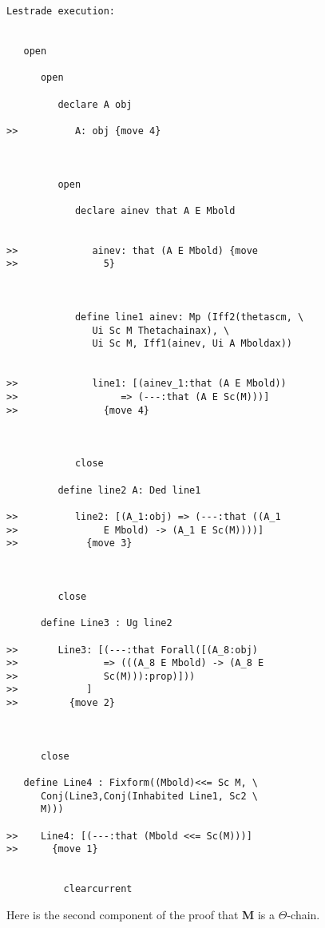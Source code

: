 \documentclass[12pt]{article}
\begin{document}
\begin{verbatim}Lestrade execution:


   open

      open

         declare A obj

>>          A: obj {move 4}



         open

            declare ainev that A E Mbold


>>             ainev: that (A E Mbold) {move
>>               5}



            define line1 ainev: Mp (Iff2(thetascm, \
               Ui Sc M Thetachainax), \
               Ui Sc M, Iff1(ainev, Ui A Mboldax))


>>             line1: [(ainev_1:that (A E Mbold))
>>                  => (---:that (A E Sc(M)))]
>>               {move 4}



            close

         define line2 A: Ded line1

>>          line2: [(A_1:obj) => (---:that ((A_1
>>               E Mbold) -> (A_1 E Sc(M))))]
>>            {move 3}



         close

      define Line3 : Ug line2

>>       Line3: [(---:that Forall([(A_8:obj)
>>               => (((A_8 E Mbold) -> (A_8 E
>>               Sc(M))):prop)]))
>>            ]
>>         {move 2}



      close

   define Line4 : Fixform((Mbold)<<= Sc M, \
      Conj(Line3,Conj(Inhabited Line1, Sc2 \
      M)))

>>    Line4: [(---:that (Mbold <<= Sc(M)))]
>>      {move 1}


          clearcurrent

\end{verbatim}

Here is the second component of the proof that {\bf M} is a $\Theta$-chain.
\end{document}
